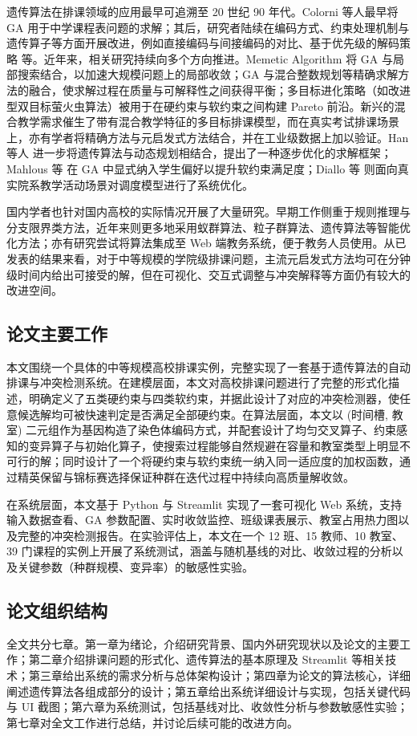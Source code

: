 遗传算法在排课领域的应用最早可追溯至 20 世纪 90 年代。Colorni 等人最早将 GA 用于中学课程表问题的求解；其后，研究者陆续在编码方式、约束处理机制与遗传算子等方面开展改进，例如直接编码与间接编码的对比、基于优先级的解码策略 等。近年来，相关研究持续向多个方向推进。Memetic Algorithm 将 GA 与局部搜索结合，以加速大规模问题上的局部收敛；GA 与混合整数规划等精确求解方法的融合，使求解过程在质量与可解释性之间获得平衡；多目标进化策略（如改进型双目标萤火虫算法）被用于在硬约束与软约束之间构建 Pareto 前沿。新兴的混合教学需求催生了带有混合教学特征的多目标排课模型，而在真实考试排课场景上，亦有学者将精确方法与元启发式方法结合，并在工业级数据上加以验证。Han 等人 进一步将遗传算法与动态规划相结合，提出了一种逐步优化的求解框架；Mahlous 等 在 GA 中显式纳入学生偏好以提升软约束满足度；Diallo 等 则面向真实院系教学活动场景对调度模型进行了系统优化。

国内学者也针对国内高校的实际情况开展了大量研究。早期工作侧重于规则推理与分支限界类方法，近年来则更多地采用蚁群算法、粒子群算法、遗传算法等智能优化方法；亦有研究尝试将算法集成至 Web 端教务系统，便于教务人员使用。从已发表的结果来看，对于中等规模的学院级排课问题，主流元启发式方法均可在分钟级时间内给出可接受的解，但在可视化、交互式调整与冲突解释等方面仍有较大的改进空间。

\subsection{论文主要工作}

本文围绕一个具体的中等规模高校排课实例，完整实现了一套基于遗传算法的自动排课与冲突检测系统。在建模层面，本文对高校排课问题进行了完整的形式化描述，明确定义了五类硬约束与四类软约束，并据此设计了对应的冲突检测器，使任意候选解均可被快速判定是否满足全部硬约束。在算法层面，本文以 (时间槽, 教室) 二元组作为基因构造了染色体编码方式，并配套设计了均匀交叉算子、约束感知的变异算子与初始化算子，使搜索过程能够自然规避在容量和教室类型上明显不可行的解；同时设计了一个将硬约束与软约束统一纳入同一适应度的加权函数，通过精英保留与锦标赛选择保证种群在迭代过程中持续向高质量解收敛。

在系统层面，本文基于 Python 与 Streamlit 实现了一套可视化 Web 系统，支持输入数据查看、GA 参数配置、实时收敛监控、班级课表展示、教室占用热力图以及完整的冲突检测报告。在实验评估上，本文在一个 12 班、15 教师、10 教室、39 门课程的实例上开展了系统测试，涵盖与随机基线的对比、收敛过程的分析以及关键参数（种群规模、变异率）的敏感性实验。

\subsection{论文组织结构}

全文共分七章。第一章为绪论，介绍研究背景、国内外研究现状以及论文的主要工作；第二章介绍排课问题的形式化、遗传算法的基本原理及 Streamlit 等相关技术；第三章给出系统的需求分析与总体架构设计；第四章为论文的算法核心，详细阐述遗传算法各组成部分的设计；第五章给出系统详细设计与实现，包括关键代码与 UI 截图；第六章为系统测试，包括基线对比、收敛性分析与参数敏感性实验；第七章对全文工作进行总结，并讨论后续可能的改进方向。
